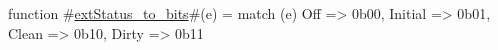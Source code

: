 function #\hyperref[sailRISCVzextStatuszytozybits]{extStatus\_to\_bits}#(e) =
  match (e) {
    Off     => 0b00,
    Initial => 0b01,
    Clean   => 0b10,
    Dirty   => 0b11
  }
